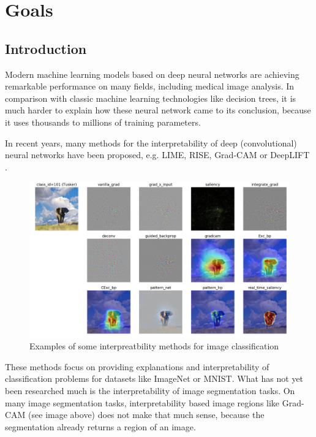 \chapter{Goals}

\section{Introduction}
Modern machine learning models based on deep neural networks are achieving remarkable performance on many fields, including medical image analysis. In comparison
with classic machine learning technologies like decision trees, it is much harder to explain how these neural network came to its conclusion, because it uses thousands to millions of training parameters.

In recent years, many methods for the interpretability of deep (convolutional) neural networks have been proposed, e.g. LIME\cite{ribeiro2016should}, RISE\cite{Petsiuk2018rise}, Grad-CAM\cite{selvaraju2017grad} or DeepLIFT \cite{shrikumar2017learning}.

\begin{figure}[h]
\centering
\caption{Examples of some interpreatbility methods for image classification \cite{visualattribution}}
\includegraphics[width=14cm]{images/tusker_saliency.png}
\end{figure}

These methods focus on providing explanations and interpretability of classification problems for datasets like ImageNet or MNIST. What has not yet been researched much is the interpretability of image segmentation tasks. On many image segmentation tasks, interpretability based image regions like Grad-CAM (see image above) does not make that much sense, because the segmentation already returns a region of an image.

